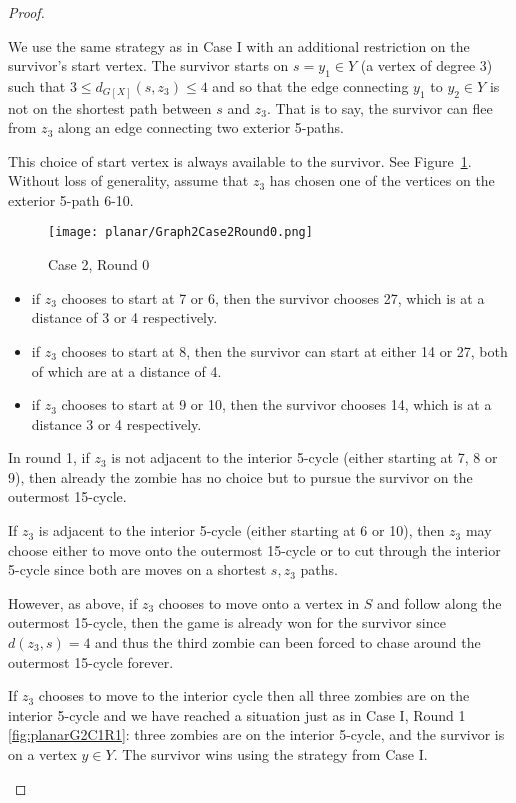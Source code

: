 \begin{proof}
\begin{description}
We use the same strategy as in Case I with an additional restriction on the survivor's start vertex.
The survivor starts on $s = y_1 \in Y$  (a vertex of degree 3) such that $3 \leq d_{G[X]}(s, z_3) \leq 4$ and so that the edge connecting $y_1$ to $y_2 \in Y$
is not on the shortest path between $s$ and $z_3$. That is to say, the survivor can flee from $z_3$ along an edge connecting two exterior 5-paths.

This choice of start vertex is always available to the survivor. See Figure~\ref{fig:planarG2C2R0}. Without loss of generality, assume that $z_3$ has chosen one of the vertices on the
exterior 5-path 6-10.

\begin{figure}
\centering
\texttt{[image: planar/Graph2Case2Round0.png]}
\caption{Case 2, Round 0\label{fig:planarG2C2R0}}
\end{figure}

\begin{itemize}
\item if $z_3$ chooses to start at 7 or 6, then the survivor chooses 27, which is at a distance of 3 or 4 respectively.
\item if $z_3$ chooses to start at 8, then the survivor can start at either 14 or 27, both of which are at a distance of 4.
\item if $z_3$ chooses to start at 9 or 10, then the survivor chooses 14, which is at a distance 3 or 4 respectively.
\end{itemize}

In round 1, if $z_3$ is not adjacent to the interior 5-cycle (either starting at 7, 8 or 9), then already the zombie has no choice but to pursue the survivor
on the outermost 15-cycle.

If $z_3$ is adjacent to the interior 5-cycle (either starting at 6 or 10), then $z_3$ may choose either to move onto the outermost 15-cycle or to cut through the interior 5-cycle since both are moves on a shortest $s,z_3$ paths.

However, as above, if $z_3$ chooses to move onto a vertex in $S$ and follow along the outermost 15-cycle, then the game is already won for the survivor since
$d(z_3, s) = 4$ and thus the third zombie can been forced to chase around the outermost 15-cycle forever.

If $z_3$ chooses to move to the interior cycle then all three zombies are on the interior 5-cycle and we have reached a situation just as in Case I, Round 1 \ref{fig:planarG2C1R1}: three zombies are on the interior 5-cycle, and the survivor is on a vertex $y\in Y$. The survivor wins using the strategy from Case I.


\end{description}
\end{proof}
